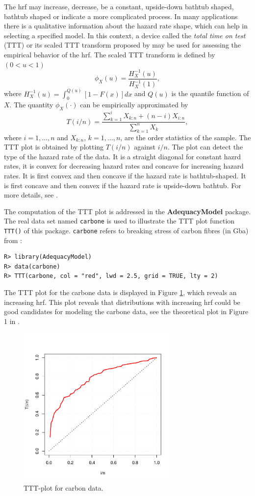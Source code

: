 \documentclass[10pt,letterpaper]{article}
\begin{document}
The hrf may  increase, decrease, be a constant, upside-down bathtub shaped, bathtub shaped or indicate a more complicated process.
In many applications there is a qualitative information about the hazard rate shape,
which can help in selecting a specified model.
In this context, a device called the {\it total time on test} (TTT) or its scaled TTT transform proposed by \cite{aarset1987} may be used for
assessing the empirical behavior of the hrf.
The scaled TTT transform is defined by $(0 < u < 1)$ $$\phi_X(u) = \frac{H^{-1}_{X}(u)}{H^{-1}_{X}(1)},$$
where $H^{-1}_{X}(u) = \int_{0}^{Q(u)}[1-F(x)]dx$ and $Q(u)$ is the quantile function of $X$.
The quantity $\phi_X(\cdot)$ can be empirically approximated by
$$T(i/n) = \frac{\sum_{k=1}^i X_{k:n} + (n - i)X_{i:n}}{\sum_{k=1}^n X_{k}},$$
where $i = 1, \ldots, n$ and $X_{k:n}$, $k=1,\ldots,n$, are the order statistics of the sample.
The TTT plot is obtained by plotting $T(i/n)$ against $i/n$.
The plot can detect the type of the hazard rate of the data.
It is a straight diagonal for constant hazrd rates,
it is convex for decreasing hazard rates and concave for increasing hazard rates.
It is first convex and then concave if the hazard rate is bathtub-shaped.
It is first concave and then convex if the hazard rate is upside-down bathtub.
For more details, see \cite{aarset1987}.

The computation of the TTT plot is addressed in the \textbf{AdequacyModel} package.
The real data set named \texttt{carbone} is used to illustrate
the TTT plot function \texttt{TTT()} of this package.
\texttt{carbone} refers to breaking stress of carbon fibres (in Gba) from \cite{nicholspadgett2006}:
\begin{verbatim}
R> library(AdequacyModel)
R> data(carbone)
R> TTT(carbone, col = "red", lwd = 2.5, grid = TRUE, lty = 2)
\end{verbatim}
The TTT plot for the carbone data \cite{nicholspadgett2006} is displayed in Figure \ref{tttplot}, which reveals an increasing hrf.
This plot reveals that distributions with increasing hrf could be good candidates for modeling the carbone data, see the theoretical
plot in Figure 1 in \cite{aarset1987}.

\begin{figure}[H]
\centering
\includegraphics[width=8cm,height=8cm]{tttplot}
\caption{TTT-plot for carbon data.}
\label{tttplot}
\end{figure}
\end{document}
